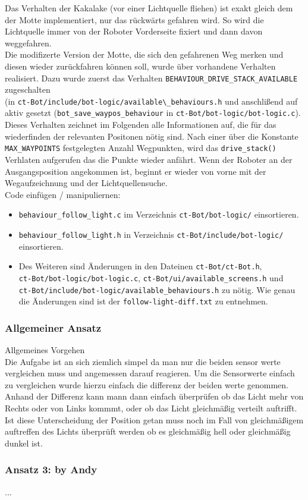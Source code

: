 Das Verhalten der Kakalake (vor einer Lichtquelle fliehen) ist exakt gleich dem der 
Motte implementiert, nur das rückwärts gefahren wird. So wird die Lichtquelle immer
von der Roboter Vorderseite fixiert und dann davon weggefahren. \\

Die modifizerte Version der Motte, die sich den gefahrenen Weg merken und diesen 
wieder zurückfahren können soll, wurde über vorhandene Verhalten realisiert.
Dazu wurde zuerst das Verhalten \verb+BEHAVIOUR_DRIVE_STACK_AVAILABLE+ zugeschalten \\
(in \verb+ct-Bot/include/bot-logic/available\_behaviours.h+ und anschlißend
auf aktiv gesetzt (\verb+bot_save_waypos_behaviour+ in
\verb+ct-Bot/bot-logic/bot-logic.c+). Dieses Verhalten zeichnet im Folgenden
alle Informationen auf, die für das wiederfinden der relevanten Positonen nötig sind.
Nach einer über die Konstante \verb+MAX_WAYPOINTS+ festgelegten Anzahl Wegpunkten,
wird das \verb+drive_stack()+ Verhlaten aufgerufen das die Punkte wieder anfährt.
Wenn der Roboter an der Ausgangsposition angekommen ist, beginnt er wieder von vorne mit
der Wegaufzeichnung und der Lichtquellensuche. \\

Code einfügen / manipuliernen:
\begin{itemize}
    \item \verb+behaviour_follow_light.c+  im Verzeichnis 
        \verb+ct-Bot/bot-logic/+ einsortieren.
    \item \verb+behaviour_follow_light.h+ in Verzeichnis
        \verb+ct-Bot/include/bot-logic/+ einsortieren.
    \item Des Weiteren sind Änderungen in den Dateinen \verb+ct-Bot/ct-Bot.h+, \\
        \verb+ct-Bot/bot-logic/bot-logic.c+,
        \verb+ct-Bot/ui/available_screens.h+ und \\
        \verb+ct-Bot/include/bot-logic/available_behaviours.h+ zu nötig.
        Wie genau die Änderungen sind ist der \verb+follow-light-diff.txt+ zu entnehmen.
\end{itemize}

\subsubsection{Allgemeiner Ansatz}

Allgemeines Vorgehen \\
Die Aufgabe ist an sich ziemlich simpel da man nur die beiden sensor werte vergleichen muss und angemessen darauf reagieren.
Um die Sensorwerte einfach zu vergleichen wurde hierzu einfach die differenz der beiden werte genommen.
Anhand der Differenz kann mann dann einfach überprüfen ob das Licht mehr von Rechts oder von Links kommmt, oder ob das Licht gleichmäßig verteilt auftrifft.
Ist diese Unterscheidung der Position getan muss noch im Fall von gleichmäßigem auftreffen des Lichts überprüft werden ob es gleichmäßig hell oder gleichmäßig dunkel ist.



\subsubsection{Ansatz 3: by Andy}
...
